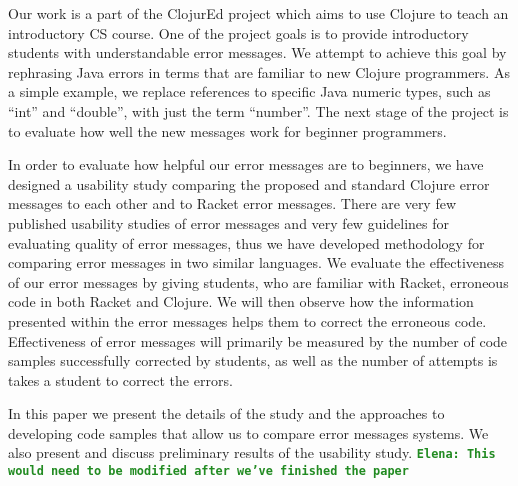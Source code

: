 \documentclass[12pt]{article}
\newcommand{\comment}[1]{{\bf \tt  {#1}}}
\newcommand{\emcomment}[1]{\textcolor{ForestGreen}{\comment{Elena: {#1}}}}
\begin{document}
Our work is a part of the ClojurEd project which aims to use Clojure to teach an introductory CS course. One of the project goals is to provide introductory students with understandable error messages. We attempt to achieve this goal by rephrasing Java errors in terms that are familiar to new Clojure programmers. As a simple example, we replace references to specific Java numeric types, such as “int” and “double”, with just the term “number”. The next stage of the project is to evaluate how well the new messages work for beginner programmers. 

In order to evaluate how helpful our error messages are to beginners, we have designed a usability study comparing the proposed and standard Clojure error messages to each other and to Racket error messages. There are very few published usability studies of error messages and very few guidelines for evaluating quality of error messages, thus we have developed methodology for comparing error messages in two similar languages. We evaluate the effectiveness of our error messages by giving students, who are familiar with Racket, erroneous code in both Racket and Clojure. We will then observe how the information presented within the error messages helps them to correct the erroneous code. Effectiveness of error messages will primarily be measured by the number of code samples successfully corrected by students, as well as the number of attempts is takes a student to correct the errors. 

In this paper we present the details of the study and the approaches to developing code samples that allow us to compare error messages systems. We also present and discuss preliminary results of the usability study. 
\emcomment{This would need to be modified after we've finished the paper}
\newpage
\setcounter{page}{1}
\end{document}
